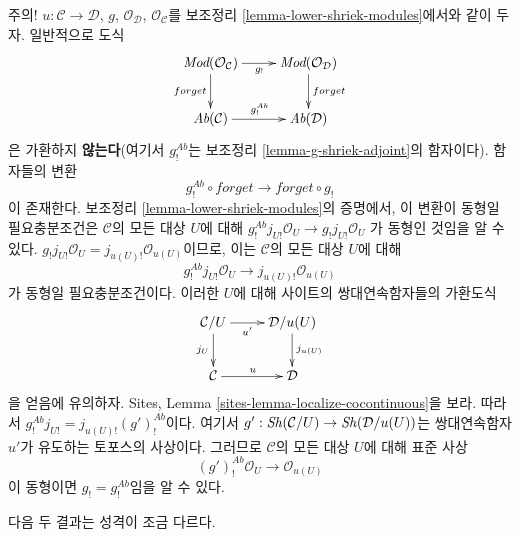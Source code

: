 \begin{remark}
\label{remark-when-shriek-equal}
주의! $u : \mathcal{C} \to \mathcal{D}$, $g$, $\mathcal{O}_\mathcal{D}$,
$\mathcal{O}_\mathcal{C}$를 보조정리 \ref{lemma-lower-shriek-modules}에서와
같이 두자. 일반적으로 도식
$$
\xymatrix{
\textit{Mod}(\mathcal{O}_\mathcal{C}) \ar[r]_{g_!} \ar[d]_{forget} &
\textit{Mod}(\mathcal{O}_\mathcal{D}) \ar[d]^{forget} \\
\textit{Ab}(\mathcal{C}) \ar[r]^{g^{Ab}_!} &
\textit{Ab}(\mathcal{D})
}
$$
은 가환하지 {\bf 않는다}(여기서 $g^{Ab}_!$는 보조정리
\ref{lemma-g-shriek-adjoint}의 함자이다). 함자들의 변환
$$
g_!^{Ab} \circ forget \longrightarrow forget \circ g_!
$$
이 존재한다. 보조정리 \ref{lemma-lower-shriek-modules}의 증명에서,
이 변환이 동형일 필요충분조건은 $\mathcal{C}$의 모든 대상 $U$에 대해
$g^{Ab}_!j_{U!}\mathcal{O}_U \to g_!j_{U!}\mathcal{O}_U$
가 동형인 것임을 알 수 있다.
$g_!j_{U!}\mathcal{O}_U = j_{u(U)!}\mathcal{O}_{u(U)}$이므로,
이는 $\mathcal{C}$의 모든 대상 $U$에 대해
$$
g^{Ab}_!j_{U!}\mathcal{O}_U \longrightarrow j_{u(U)!}\mathcal{O}_{u(U)}
$$
가 동형일 필요충분조건이다. 이러한 $U$에 대해 사이트의 쌍대연속함자들의
가환도식
$$
\xymatrix{
\mathcal{C}/U \ar[r]_-{u'} \ar[d]_{j_U} & \mathcal{D}/u(U) \ar[d]^{j_{u(U)}} \\
\mathcal{C} \ar[r]^u & \mathcal{D}
}
$$
을 얻음에 유의하자. Sites, Lemma
\ref{sites-lemma-localize-cocontinuous}을 보라. 따라서
$g^{Ab}_!j_{U!} = j_{u(U)!}(g')^{Ab}_!$이다. 여기서
$g' : \mathop{\mathit{Sh}}\nolimits(\mathcal{C}/U) \to \mathop{\mathit{Sh}}\nolimits(\mathcal{D}/u(U))$는 쌍대연속함자
$u'$가 유도하는 토포스의 사상이다. 그러므로 $\mathcal{C}$의 모든 대상
$U$에 대해 표준 사상
\begin{equation}
\label{equation-compare-on-localizations}
(g')^{Ab}_!\mathcal{O}_U \longrightarrow \mathcal{O}_{u(U)}
\end{equation}
이 동형이면 $g_! = g^{Ab}_!$임을 알 수 있다.
\end{remark}

\noindent
다음 두 결과는 성격이 조금 다르다.

